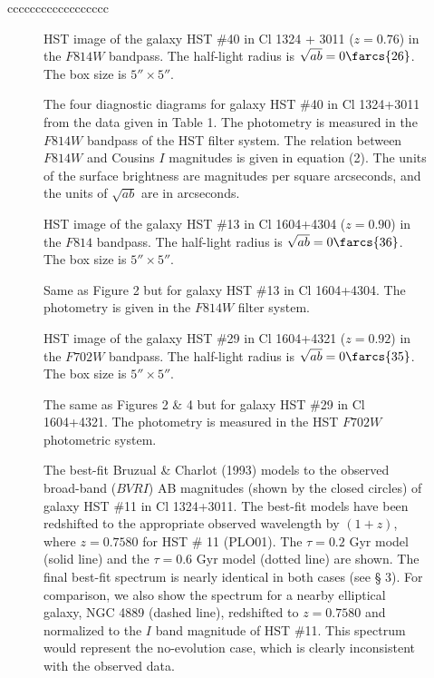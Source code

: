 \documentclass[preprint]{aastex}
\begin{document}
\begin{deluxetable}{cccccccccccccccccc}
\end{deluxetable}

\newpage

\begin{figure}
\caption{HST image of the galaxy HST \#40 in Cl 1324 + 3011 ($z =
0.76$) in the $F814W$ bandpass. The half-light radius is $\sqrt{ab} =
0\farcs{26}$. The box size is $5'' \times 5''$.}
\end{figure}

\begin{figure}
\caption{The four diagnostic diagrams for galaxy HST \#40 in Cl
1324+3011 from the data given in Table 1. The photometry is measured
in the $F814W$ bandpass of the HST filter system. The relation between
$F814W$ and Cousins $I$ magnitudes is given in equation (2). The units
of the surface brightness are magnitudes per square arcseconds, and
the units of $\sqrt{ab}$ are in arcseconds.}
\end{figure}

\begin{figure}
\caption{HST image of the galaxy HST \#13 in Cl 1604+4304 ($z = 0.90$)
in the $F814$ bandpass. The half-light radius is $\sqrt{ab} =
0\farcs{36}$. The box size is $5'' \times 5''$.}
\end{figure}

\begin{figure}
\caption{Same as Figure 2 but for galaxy HST \#13 in Cl 1604+4304.
The photometry is given in the $F814W$ filter system.}
\end{figure}

\begin{figure}
\caption{HST image of the galaxy HST \#29 in Cl 1604+4321 ($z = 0.92$)
in the $F702W$ bandpass. The half-light radius is $\sqrt{ab} =
0\farcs{35}$. The box size is $5'' \times 5''$.}
\end{figure}

\begin{figure}
\caption{The same as Figures 2 \& 4 but for galaxy HST \#29 in 
Cl 1604+4321. The photometry is measured in the HST $F702W$
photometric system.}
\end{figure}

\begin{figure}
\caption{The best-fit Bruzual \& Charlot (1993) models to the observed
broad-band ($BVRI$) AB magnitudes (shown by the closed circles) of
galaxy HST \#11 in Cl 1324+3011. The best-fit models have been
redshifted to the appropriate observed wavelength by $(1+z)$, where $z
= 0.7580$ for HST \# 11 (PLO01). The $\tau = 0.2$ Gyr model (solid
line) and the $\tau = 0.6$ Gyr model (dotted line) are shown. The
final best-fit spectrum is nearly identical in both cases (see \S
3). For comparison, we also show the spectrum for a nearby elliptical
galaxy, NGC 4889 (dashed line), redshifted to $z = 0.7580$ and
normalized to the $I$ band magnitude of HST \#11. This spectrum would
represent the no-evolution case, which is clearly inconsistent with
the observed data.}
\end{figure}
\end{document}

